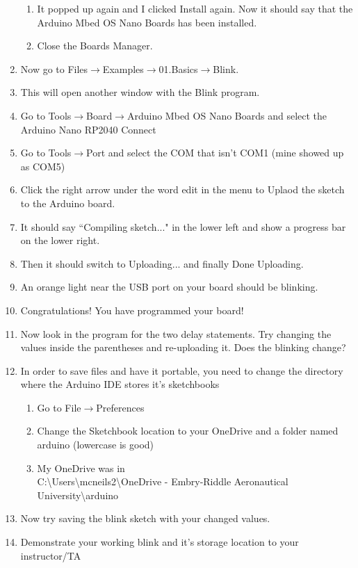 \begin{enumerate}
\begin{enumerate}
		\item It popped up again and I clicked Install again. Now it should say that the Arduino Mbed OS Nano Boards has been installed.
		\item Close the Boards Manager.
	\end{enumerate}
	\item Now go to Files$\rightarrow$Examples$\rightarrow$01.Basics$\rightarrow$Blink.
	\item This will open another window with the Blink program.
	\item Go to Tools$\rightarrow$Board$\rightarrow$Arduino Mbed OS Nano Boards and select the Arduino Nano RP2040 Connect
	\item Go to Tools$\rightarrow$Port and select the COM that isn't COM1 (mine showed up as COM5)
	\item Click the right arrow under the word edit in the menu to Uplaod the sketch to the Arduino board.
	\item It should say ``Compiling sketch..." in the lower left and show a progress bar on the lower right.
	\item Then it should switch to Uploading... and finally Done Uploading.
	\item An orange light near the USB port on your board should be blinking.
	\item Congratulations! You have programmed your board!
	\item Now look in the program for the two delay statements. Try changing the values inside the parentheses and re-uploading it. Does the blinking change?
	\item In order to save files and have it portable, you need to change the directory where the Arduino IDE stores it's sketchbooks
	\begin{enumerate}
		\item Go to File$\rightarrow$Preferences
		\item Change the Sketchbook location to your OneDrive and a folder named arduino (lowercase is good)
		\item My OneDrive was in \\C:\textbackslash Users\textbackslash mcneils2\textbackslash OneDrive - Embry-Riddle 
		Aeronautical University\textbackslash arduino
	\end{enumerate}
	\item Now try saving the blink sketch with your changed values.
	\item Demonstrate your working blink and it's storage location to your instructor/TA

\end{enumerate}
